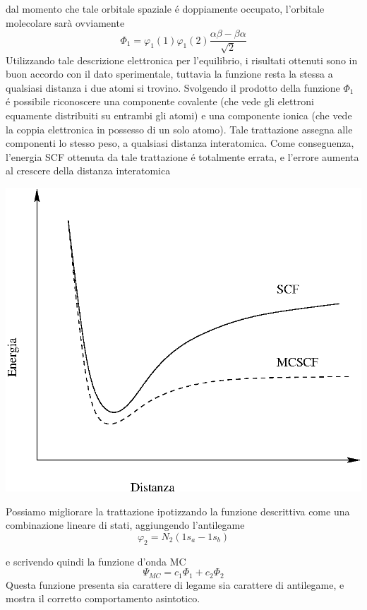 dal momento che tale orbitale spaziale \'e doppiamente occupato,
l'orbitale molecolare sar\`a ovviamente
$$
\Phi_1 = \varphi_1(1) \varphi_1(2) \frac{\alpha \beta - \beta \alpha}{\sqrt{2}}
$$
Utilizzando tale descrizione elettronica per l'equilibrio, i risultati
ottenuti sono in buon accordo con il dato sperimentale, tuttavia la
funzione resta la stessa a qualsiasi distanza i due atomi si trovino.
Svolgendo il prodotto della funzione $ \Phi_1 $ \'e possibile riconoscere
una componente covalente (che vede gli elettroni equamente distribuiti
su entrambi gli atomi) e una componente ionica (che vede la coppia
elettronica in possesso di un solo atomo). Tale trattazione assegna alle
componenti lo stesso peso, a qualsiasi distanza interatomica.
Come conseguenza, l'energia SCF ottenuta da tale trattazione \'e
totalmente errata, e l'errore aumenta al crescere della distanza
interatomica
\begin{center}
\vspace{0.3cm}
\includegraphics{../immagini/SCF-MCSCF.eps} 
\vspace{0.3cm}
\end{center}

Possiamo migliorare la trattazione ipotizzando la funzione descrittiva
come una combinazione lineare di stati, aggiungendo l'antilegame
$$
\varphi_2=N_2 \left( 1s_a - 1s_b \right)
$$

e scrivendo quindi la funzione d'onda MC
$$
\Psi_{MC} = c_1 \Phi_1 + c_2 \Phi_2
$$
Questa funzione presenta sia carattere di legame sia carattere di
antilegame, e mostra il corretto comportamento asintotico.

